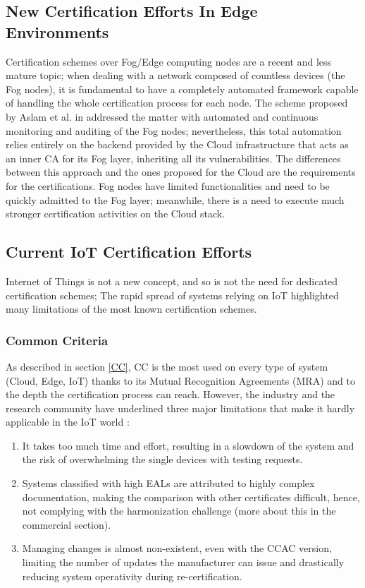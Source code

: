\subsection{New Certification Efforts In Edge Environments}
Certification schemes over Fog/Edge computing nodes are a recent and less mature topic; when dealing with a network composed of countless devices (the Fog nodes), it is fundamental to have a completely automated framework capable of handling the whole certification process for each node. The scheme proposed by Aslam et al. in \cite{aslam2020fonac} addressed the matter with automated and continuous monitoring and auditing of the Fog nodes; nevertheless, this total automation relies entirely on the backend provided by the Cloud infrastructure that acts as an inner CA for its Fog layer, inheriting all its vulnerabilities. The differences between this approach and the ones proposed for the Cloud are the requirements for the certifications. Fog nodes have limited functionalities and need to be quickly admitted to the Fog layer; meanwhile, there is a need to execute much stronger certification activities on the Cloud stack.

\subsection{Current IoT Certification Efforts}
Internet of Things is not a new concept, and so is not the need for dedicated certification schemes; The rapid spread of systems relying on IoT highlighted many limitations of the most known certification schemes.

\subsubsection{Common Criteria}
As described in section \ref{CC}, CC is the most used on every type of system (Cloud, Edge, IoT) thanks to its Mutual Recognition Agreements (MRA) and to the depth the certification process can reach. However, the industry and the research community have underlined three major limitations that make it hardly applicable in the IoT world \cite{kaluvuri2014quantitative}\cite{keblawi2006applying}:
\begin{enumerate}
    \item It takes too much time and effort, resulting in a slowdown of the system and the risk of overwhelming the single devices with testing requests.
    \item Systems classified with high EALs are attributed to highly complex documentation, making the comparison with other certificates difficult, hence, not complying with the harmonization challenge (more about this in the commercial section).
    \item Managing changes is almost non-existent, even with the CCAC version, limiting the number of updates the manufacturer can issue and drastically reducing system operativity during re-certification.
\end{enumerate}


